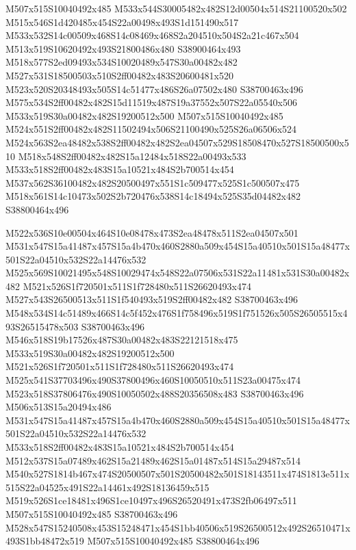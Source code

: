 \documentclass{article}
\begin{document}
\begin{multicols}{2}
M507x515S10040492x485 M533x544S30005482x482S12d00504x514S21100520x502 M515x546S1d420485x454S22a00498x493S1d151490x517 M533x532S14c00509x468S14c08469x468S2a204510x504S2a21c467x504 M513x519S10620492x493S21800486x480 S38900464x493 M518x577S2ed09493x534S10020489x547S30a00482x482 M527x531S18500503x510S2ff00482x483S20600481x520 M523x520S20348493x505S14c51477x486S26a07502x480 S38700463x496 M575x534S2ff00482x482S15d11519x487S19a37552x507S22a05540x506 M533x519S30a00482x482S19200512x500 M507x515S10040492x485 M524x551S2ff00482x482S11502494x506S21100490x525S26a06506x524 M524x563S2ea48482x538S2ff00482x482S2ea04507x529S18508470x527S18500500x510 M518x548S2ff00482x482S15a12484x518S22a00493x533 M533x518S2ff00482x483S15a10521x484S2b700514x454 M537x562S36100482x482S20500497x551S1c509477x525S1c500507x475 M518x561S14c10473x502S2b720476x538S14c18494x525S35d04482x482 S38800464x496

M522x536S10e00504x464S10e08478x473S2ea48478x511S2ea04507x501 M531x547S15a41487x457S15a4b470x460S2880a509x454S15a40510x501S15a48477x501S22a04510x532S22a14476x532 M525x569S10021495x548S10029474x548S22a07506x531S22a11481x531S30a00482x482 M521x526S1f720501x511S1f728480x511S26620493x474 M527x543S26500513x511S1f540493x519S2ff00482x482 S38700463x496 M548x534S14c51489x466S14c5f452x476S1f758496x519S1f751526x505S26505515x493S26515478x503 S38700463x496 M546x518S19b17526x487S30a00482x483S22121518x475 M533x519S30a00482x482S19200512x500 M521x526S1f720501x511S1f728480x511S26620493x474 M525x541S37703496x490S37800496x460S10050510x511S23a00475x474 M523x518S37806476x490S10050502x488S20356508x483 S38700463x496 M506x513S15a20494x486 M531x547S15a41487x457S15a4b470x460S2880a509x454S15a40510x501S15a48477x501S22a04510x532S22a14476x532 M533x518S2ff00482x483S15a10521x484S2b700514x454 M512x537S15a07489x462S15a21489x462S15a01487x514S15a29487x514 M540x527S1814b467x474S20500507x501S20500482x501S18143511x474S1813e511x515S22a04525x491S22a14461x492S18136459x515 M519x526S1ce18481x496S1ce10497x496S26520491x473S2fb06497x511 M507x515S10040492x485 S38700463x496 M528x547S15240508x453S15248471x454S1bb40506x519S26500512x492S26510471x493S1bb48472x519 M507x515S10040492x485 S38800464x496


\end{multicols}
\end{document}
